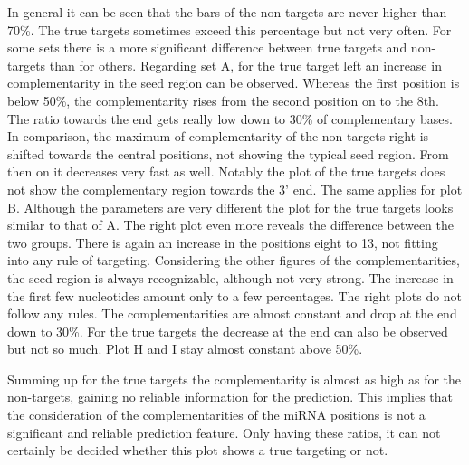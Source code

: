 \documentclass[12pt]{article}
\begin{document}
In general it can be seen that the bars of the non-targets are never higher than 70\%. The true targets sometimes exceed this percentage but not very often. For some sets there is a more significant difference between true targets and non-targets than for others. Regarding set A, for the true target left an increase in complementarity in the seed region can be observed. Whereas the first position is below 50\%, the complementarity rises from the second position on to the 8th. The ratio towards the end gets really low down to 30\% of complementary bases. In comparison, the maximum of complementarity of the non-targets right is shifted towards the central positions, not showing the typical seed region. From then on it decreases very fast as well. Notably the plot of the true targets does not show the complementary region towards the 3' end. The same applies for plot B. Although the parameters are very different the plot for the true targets looks similar to that of A. The right plot even more reveals the difference between the two groups. There is again an increase in the positions eight to 13, not fitting into any rule of targeting.
Considering the other figures of the complementarities, the seed region is always recognizable, although not very strong. The increase in the first few nucleotides amount only to a few percentages. The right plots do not follow any rules. The complementarities are almost constant and drop at the end down to 30\%. For the true targets the decrease at the end can also be observed but not so much. Plot H and I stay almost constant above 50\%.

Summing up for the true targets the complementarity is almost as high as for the non-targets, gaining no reliable information for the prediction. This implies that the consideration of the complementarities of the miRNA positions is not a significant and reliable prediction feature. Only having these ratios, it can not certainly be decided whether this plot shows a true targeting or not. \\
\end{document}
